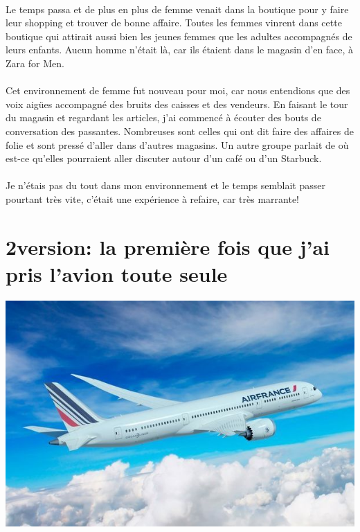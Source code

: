 \paragraph{} Le temps passa et de plus en plus de femme venait dans la boutique
pour y faire leur shopping et trouver de bonne affaire. Toutes les femmes
vinrent dans cette boutique qui attirait aussi bien les jeunes femmes que les
adultes accompagnés de leurs enfants. Aucun homme n'était là, car ils étaient
dans le magasin d'en face, à Zara for Men.

\paragraph{} Cet environnement de femme fut nouveau pour moi, car nous
entendions que des voix aigües accompagné des bruits des caisses et des
vendeurs. En faisant le tour du magasin et regardant les articles, j'ai
commencé à écouter des bouts de conversation des passantes.  Nombreuses sont
celles qui ont dit faire des affaires de folie et sont pressé d'aller dans
d'autres magasins. Un autre groupe parlait de où est-ce qu'elles pourraient
aller discuter autour d'un café ou d'un Starbuck.

\paragraph{} Je n'étais pas du tout dans mon environnement et le temps semblait
passer pourtant très vite, c'était une expérience à refaire, car très marrante!

\section[2\ieme version: l'avion]{2\ieme version: la première fois que j'ai pris l'avion toute seule}

\begin{center}
	\includegraphics[scale=0.6]{avion.jpg}
\end{center}

